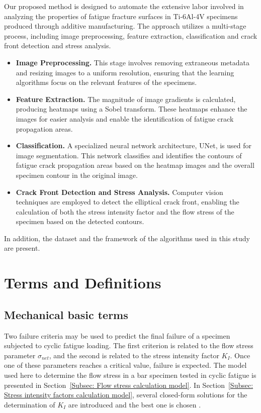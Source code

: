 \documentclass{ieeeaccess}
\begin{document}
Our proposed method is designed to automate the extensive labor involved in analyzing the properties of fatigue fracture surfaces in Ti-6Al-4V specimens produced through additive manufacturing. The approach utilizes a multi-stage process, including image preprocessing, feature extraction, classification and crack front detection and stress analysis.
\begin{itemize}
    \item \textbf{Image Preprocessing.} This stage involves removing extraneous metadata and resizing images to a uniform resolution, ensuring that the learning algorithms focus on the relevant features of the specimens.
    
    \item \textbf{Feature Extraction.} The magnitude of image gradients is calculated, producing heatmaps using a Sobel transform. These heatmaps enhance the images for easier analysis and enable the identification of fatigue crack propagation areas.
    
    \item \textbf{Classification.} A specialized neural network architecture, UNet, is used for image segmentation. This network classifies and identifies the contours of fatigue crack propagation areas based on the heatmap images and the overall specimen contour in the original image.
    
    \item \textbf{Crack Front Detection and Stress Analysis.} Computer vision techniques are employed to detect the elliptical crack front, enabling the calculation of both the stress intensity factor and the flow stress of the specimen based on the detected contours.
\end{itemize}
In addition, the dataset and the framework of the algorithms used in this study are present.

\section{Terms and Definitions}

\subsection{Mechanical basic terms}  \label{sec:Basic terms}

 
Two failure criteria may be used to predict the final failure of a specimen subjected to cyclic fatigue loading. The first criterion is related to the flow stress parameter \(\sigma_{net}\), and the second is related to the stress intensity factor \(K_{I}\). Once one of these parameters reaches a critical value, failure is expected. The model used here to determine the flow stress in a bar specimen tested in cyclic fatigue is presented in Section~\ref{Subsec: Flow stress calculation model}.
In Section~\ref{Subsec: Stress intensity factors calculation model}, several closed-form solutions for the determination of \(K_I\) are introduced and the best one is chosen \cite{shin2004experimental}.   
\end{document}
